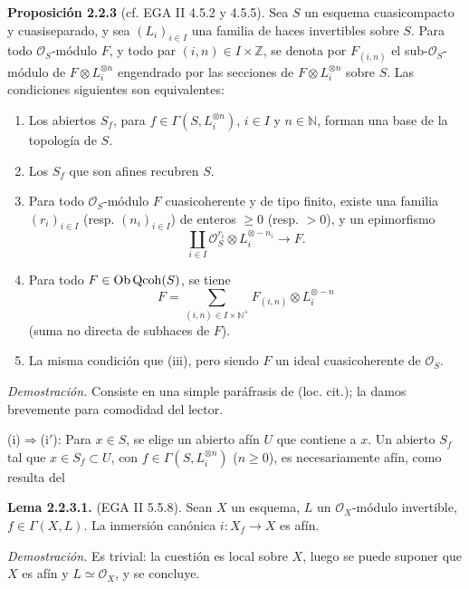 \providecommand{\sisi}[2]{#2}

\textbf{Proposición 2.2.3} (cf. EGA II 4.5.2 y 4.5.5). Sea $S$ un esquema cuasicompacto y cuasiseparado, y sea $(L_i)_{i\in I}$ una familia de haces invertibles sobre $S$. Para todo $\mathcal O_S$-módulo $F$, y todo par $(i,n)\in I\times\mathbb Z$, se denota por $F_{(i,n)}$ el sub-$\mathcal O_S$-módulo de $F\otimes L_i^{\otimes n}$ engendrado por las secciones de $F\otimes L_i^{\otimes n}$ sobre $S$. Las condiciones siguientes son equivalentes:
\begin{enumerate}
\item[(i)] Los abiertos $S_f$, para $f\in\Gamma(S,L_i^{\otimes n})$, $i\in I$ y $n\in\mathbb N$, forman una base de la topología de $S$.
\item[(i$'$)] Los $S_f$ que son afines recubren $S$.
\item[(ii)] Para todo $\mathcal O_S$-módulo $F$ cuasicoherente y de tipo finito, existe una familia $(r_i)_{i\in I}$ (resp. $(n_i)_{i\in I}$) de enteros $\ge0$ (resp. $>0$), y un epimorfismo
\[
\coprod_{i\in I}\mathcal O_S^{r_i}\otimes L_i^{\otimes-n_i}\longrightarrow F.
\]
\item[(iii)] Para todo $F\in\operatorname{Ob}\operatorname{Qcoh}(S)$, se tiene
\[
F=\sum_{(i,n)\in I\times\mathbb N^+}F_{(i,n)}\otimes L_i^{\otimes-n}
\]
(suma no directa de subhaces de $F$).
\item[(iii$'$)] La misma condición que (iii), pero siendo $F$ un ideal cuasicoherente de $\mathcal O_S$.
\end{enumerate}

\emph{Demostración.} Consiste en una simple paráfrasis de (loc. cit.); la damos brevemente para comodidad del lector.

(i)$\Rightarrow$(i$'$): Para $x\in S$, se elige un abierto afín $U$ que contiene a $x$. Un abierto $S_f$ tal que $x\in S_f\subset U$, con $f\in\Gamma(S,L_i^{\otimes n})$ ($n\ge0$), es necesariamente afín, como resulta del

\textbf{Lema 2.2.3.1.} (EGA II 5.5.8). Sean $X$ un esquema, $L$ un $\mathcal O_X$-módulo invertible, $f\in\Gamma(X,L)$. La inmersión canónica $i:X_f\to X$ es afín.

\emph{Demostración.} Es trivial: la cuestión es local sobre $X$, luego se puede suponer que $X$ es afín y $L\simeq\mathcal O_X$, y se concluye.

